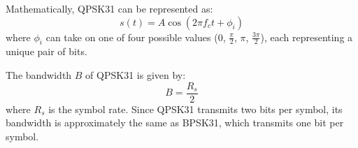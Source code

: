 Mathematically, QPSK31 can be represented as:
\[
s(t) = A \cos(2\pi f_c t + \phi_i)
\]
where \( \phi_i \) can take on one of four possible values (0, \(\frac{\pi}{2}\), \(\pi\), \(\frac{3\pi}{2}\)), each representing a unique pair of bits.

The bandwidth \( B \) of QPSK31 is given by:
\[
B = \frac{R_s}{2}
\]
where \( R_s \) is the symbol rate. Since QPSK31 transmits two bits per symbol, its bandwidth is approximately the same as BPSK31, which transmits one bit per symbol.


